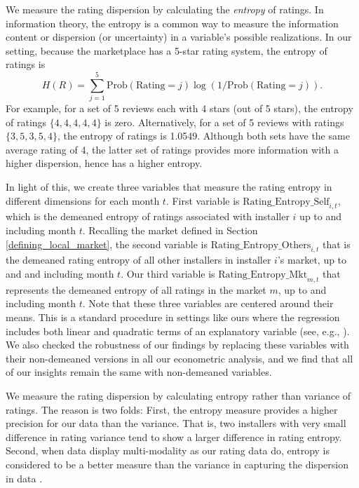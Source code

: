 \documentclass[msom,blindrev]{informs3}
\begin{document}
	We measure the rating dispersion by calculating the \emph{entropy} of ratings. In information theory, the entropy is a common way to measure the information content or dispersion (or uncertainty) in a variable's possible realizations. In our setting, because the marketplace has a 5-star rating system, the entropy of ratings is
	\begin{equation}\label{def: entropy}
	H(R)= \sum_{j=1}^{5} \text{Prob}(\text{Rating}=j) \log(1/\text{Prob}(\text{Rating}=j)).
	\end{equation}
	For example, for a set of 5 reviews each with 4 stars (out of 5 stars), the entropy of ratings $\{4,4,4,4,4\}$ is zero. Alternatively, for a set of 5 reviews with ratings $\{3,5,3,5,4\}$, the entropy of ratings is 1.0549. Although both sets have the same average rating of 4, the latter set of ratings provides more information with a higher dispersion, hence has a higher entropy.
	
	
	In light of this, we create three variables that measure the rating entropy in different dimensions for each month $t$. First variable is $\text{Rating\_Entropy\_Self}_{i,t}$, which is the demeaned entropy of ratings associated with installer $i$ up to and including month $t$. Recalling the market defined in Section \ref{defining_local_market}, the second variable is $\text{Rating\_Entropy\_Others}_{i,t}$ that is the demeaned rating entropy of all other installers in installer $i$'s market, up to and and including month $t$. Our third variable is $\text{Rating\_Entropy\_Mkt}_{m,t}$ that represents the demeaned entropy of all ratings in the market $m$, up to and including month $t$. Note that these three variables are centered around their means. This is a standard procedure in settings like ours where the regression includes both linear and quadratic terms of an explanatory variable (see, e.g., \cite{tan2014does}). We also checked the robustness of our findings by replacing these variables with their non-demeaned versions in all our econometric analysis, and we find that all of our insights remain the same with non-demeaned variables.
	
	We measure the rating dispersion by calculating entropy rather than variance of ratings. The reason is two folds: First, the entropy measure provides a higher precision for our data than the variance. That is, two installers with very small difference in rating variance tend to show a larger difference in rating
entropy. Second, when data display multi-modality as our rating data do, entropy is considered to be a better measure than the variance in capturing the dispersion in data \citep{smaldino2013measures}.
	
\end{document}
